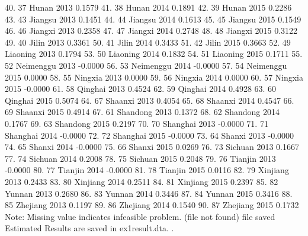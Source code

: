  40. {\VBAR}  37          Hunan   2013    0.1579 {\VBAR}
 41. {\VBAR}  38          Hunan   2014    0.1891 {\VBAR}
 42. {\VBAR}  39          Hunan   2015    0.2286 {\VBAR}
 43. {\VBAR}  43        Jiangsu   2013    0.1451 {\VBAR}
 44. {\VBAR}  44        Jiangsu   2014    0.1613 {\VBAR}
 45. {\VBAR}  45        Jiangsu   2015    0.1549 {\VBAR}
 46. {\VBAR}  46        Jiangxi   2013    0.2358 {\VBAR}
 47. {\VBAR}  47        Jiangxi   2014    0.2748 {\VBAR}
 48. {\VBAR}  48        Jiangxi   2015    0.3122 {\VBAR}
 49. {\VBAR}  40          Jilin   2013    0.3361 {\VBAR}
 50. {\VBAR}  41          Jilin   2014    0.3433 {\VBAR}
 51. {\VBAR}  42          Jilin   2015    0.3663 {\VBAR}
 52. {\VBAR}  49       Liaoning   2013    0.1794 {\VBAR}
 53. {\VBAR}  50       Liaoning   2014    0.1832 {\VBAR}
 54. {\VBAR}  51       Liaoning   2015    0.1711 {\VBAR}
 55. {\VBAR}  52      Neimenggu   2013   -0.0000 {\VBAR}
 56. {\VBAR}  53      Neimenggu   2014   -0.0000 {\VBAR}
 57. {\VBAR}  54      Neimenggu   2015    0.0000 {\VBAR}
 58. {\VBAR}  55        Ningxia   2013    0.0000 {\VBAR}
 59. {\VBAR}  56        Ningxia   2014    0.0000 {\VBAR}
 60. {\VBAR}  57        Ningxia   2015   -0.0000 {\VBAR}
 61. {\VBAR}  58        Qinghai   2013    0.4524 {\VBAR}
 62. {\VBAR}  59        Qinghai   2014    0.4928 {\VBAR}
 63. {\VBAR}  60        Qinghai   2015    0.5074 {\VBAR}
 64. {\VBAR}  67        Shaanxi   2013    0.4054 {\VBAR}
 65. {\VBAR}  68        Shaanxi   2014    0.4547 {\VBAR}
 66. {\VBAR}  69        Shaanxi   2015    0.4914 {\VBAR}
 67. {\VBAR}  61       Shandong   2013    0.1372 {\VBAR}
 68. {\VBAR}  62       Shandong   2014    0.1767 {\VBAR}
 69. {\VBAR}  63       Shandong   2015    0.2197 {\VBAR}
 70. {\VBAR}  70       Shanghai   2013   -0.0000 {\VBAR}
 71. {\VBAR}  71       Shanghai   2014   -0.0000 {\VBAR}
 72. {\VBAR}  72       Shanghai   2015   -0.0000 {\VBAR}
 73. {\VBAR}  64         Shanxi   2013   -0.0000 {\VBAR}
 74. {\VBAR}  65         Shanxi   2014   -0.0000 {\VBAR}
 75. {\VBAR}  66         Shanxi   2015    0.0269 {\VBAR}
 76. {\VBAR}  73        Sichuan   2013    0.1667 {\VBAR}
 77. {\VBAR}  74        Sichuan   2014    0.2008 {\VBAR}
 78. {\VBAR}  75        Sichuan   2015    0.2048 {\VBAR}
 79. {\VBAR}  76        Tianjin   2013   -0.0000 {\VBAR}
 80. {\VBAR}  77        Tianjin   2014   -0.0000 {\VBAR}
 81. {\VBAR}  78        Tianjin   2015    0.0116 {\VBAR}
 82. {\VBAR}  79       Xinjiang   2013    0.2433 {\VBAR}
 83. {\VBAR}  80       Xinjiang   2014    0.2511 {\VBAR}
 84. {\VBAR}  81       Xinjiang   2015    0.2397 {\VBAR}
 85. {\VBAR}  82         Yunnan   2013    0.2680 {\VBAR}
 86. {\VBAR}  83         Yunnan   2014    0.3446 {\VBAR}
 87. {\VBAR}  84         Yunnan   2015    0.3416 {\VBAR}
 88. {\VBAR}  85       Zhejiang   2013    0.1197 {\VBAR}
 89. {\VBAR}  86       Zhejiang   2014    0.1540 {\VBAR}
 90. {\VBAR}  87       Zhejiang   2015    0.1732 {\VBAR}
     {\BLC}
Note: Missing value indicates infeasible problem.
(file{} not found)
file{} saved
{\smallskip}
Estimated Results are saved in ex1result.dta.
{\smallskip}
. 
